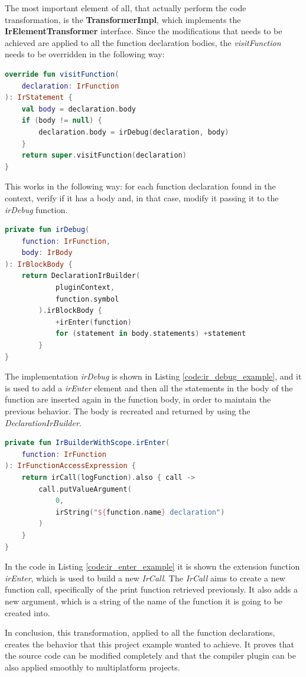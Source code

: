 The most important element of all, that actually perform the code transformation, is the \textbf{TransformerImpl}, which implements the \textbf{IrElementTransformer} interface.\newline
Since the modifications that needs to be achieved are applied to all the function declaration bodies, the \textit{visitFunction}  needs to be overridden in the following way:
\begin{lstlisting}[caption={Example of \textit{visitFunction} implementation of the transformer, used to visit all the function declarations}, captionpos=b, language=Kotlin, label={code:visit_function_declaration_example}]
override fun visitFunction(
    declaration: IrFunction
): IrStatement {
    val body = declaration.body
    if (body != null) {
        declaration.body = irDebug(declaration, body)
    }
    return super.visitFunction(declaration)
}
\end{lstlisting}
This works in the following way: for each function declaration found in the context, verify if it has a body and, in that case, modify it passing it to the \textit{irDebug} function.
\begin{lstlisting}[caption={Example of implementation of a function that adds a new element into the function body}, captionpos=b, language=Kotlin, label={code:ir_debug_example}]
private fun irDebug(
    function: IrFunction,
    body: IrBody
): IrBlockBody {
    return DeclarationIrBuilder(
            pluginContext,
            function.symbol
        ).irBlockBody {
            +irEnter(function)
            for (statement in body.statements) +statement
        }
}
\end{lstlisting}
The implementation \textit{irDebug} is shown in Listing \ref{code:ir_debug_example}, and it is used to add a \textit{irEnter} element and then all the statements in the body of the function are inserted again in the function body, in order to maintain the previous behavior. The body is recreated and returned by using the \textit{DeclarationIrBuilder}.

\begin{lstlisting}[caption={Example of creation of a new function call and adding to it arguments}, captionpos=b, language=Kotlin, label={code:ir_enter_example}]
private fun IrBuilderWithScope.irEnter(
    function: IrFunction
): IrFunctionAccessExpression {
    return irCall(logFunction).also { call ->
        call.putValueArgument(
            0,
            irString("${function.name} declaration")
        )
    }
}
\end{lstlisting}
In the code in Listing \ref{code:ir_enter_example} it is shown the extension function \textit{irEnter}, which is used to build a new \textit{IrCall}. The \textit{IrCall} aims to create a new function call, specifically of the print function retrieved previously. It also adds a new argument, which is a string of the name of the function it is going to be created into.

In conclusion, this transformation, applied to all the function declarations, creates the behavior that this project example wanted to achieve.\newline
It proves that the source code can be modified completely and that the compiler plugin can be also applied smoothly to multiplatform projects.